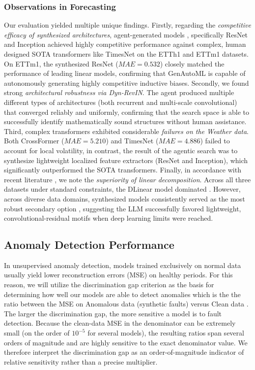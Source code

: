 \documentclass{article}
\begin{document}
\subsubsection{Observations in Forecasting}
Our evaluation  yielded multiple unique findings. Firstly, regarding the \textit{competitive efficacy of synthesized architectures}, agent-generated models , specifically ResNet and Inception achieved highly competitive performance against complex, human designed SOTA transformers like TimesNet on the ETTh1 and ETTm1 datasets. On ETTm1, the synthesized ResNet ($MAE=0.532$) closely matched the performance of leading linear models, confirming that GenAutoML is capable of autonomously generating highly competitive inductive biases. Secondly, we found strong \textit{architectural robustness via Dyn-RevIN}. The agent produced multiple different types of architectures (both recurrent and multi-scale convolutional) that converged reliably and uniformly, confirming that the search space is able to successfully identify mathematically sound structures without human assistance. Third, complex transformers exhibited considerable \textit{failures on the Weather data}. Both CrossFormer ($MAE=5.210$) and TimesNet ($MAE=4.886$) failed to account for local volatility, in contrast, the result of the agentic search was to synthesize lightweight localized feature extractors (ResNet and Inception), which significantly outperformed the SOTA transformers. Finally, in accordance with recent literature \cite{zeng2022are}, we note the \textit{superiority of linear decomposition}. Across all three datasets under standard constraints, the DLinear model dominated . However, across diverse data domains, synthesized models consistently served as the most robust secondary option , suggesting the LLM successfully favored lightweight, convolutional-residual motifs when deep learning limits were reached.


\subsection{Anomaly Detection Performance}
\label{subsec:anomalper}
In unsupervised anomaly detection, models trained exclusively on normal data usually yield lower reconstruction errors (MSE) on healthy periods. For this reason, we will utilize the discrimination gap criterion as the basis for determining how well our models are able to detect anomalies which is the the ratio between the MSE on Anomalous data (synthetic faults) versus Clean data \cite{audi}. The larger the discrimination gap, the more sensitive a model is to fault detection. Because the clean-data MSE in the denominator can be extremely small (on the order of $10^{-5}$ for several models), the resulting ratios span several orders of magnitude and are highly sensitive to the exact denominator value. We therefore interpret the discrimination gap as an order-of-magnitude indicator of relative sensitivity rather than a precise multiplier.
\end{document}
